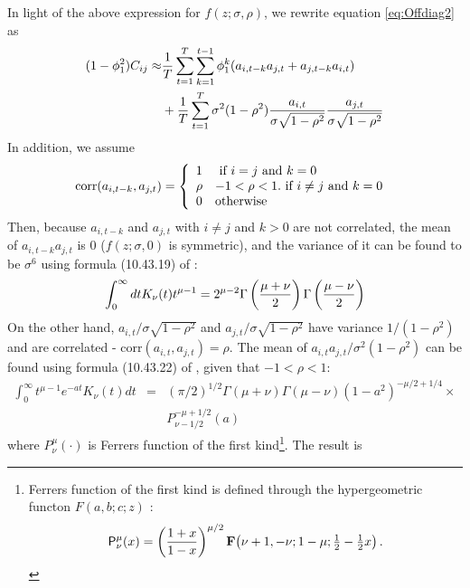 In light of the above expression for $f(z; \sigma,
\rho)$, we rewrite equation \ref{eq:Offdiag2} as
\begin{equation}\label{eq:Cij_dist}
  \begin{aligned}
    (1 - \phi_1^2)C_{ij} \approx &
    {1 \over T}
    \sum_{t=1}^{T} \sum_{k=1}^{t-1}\phi_1^k (a_{i, t-k} a_{j, t} + a_{j,
      t-k} a_{i, t}) \\
    & + {1 \over T} \sum_{t=1}^{T} \sigma^2 (1 - \rho^2) {a_{i,t} \over
      \sigma \sqrt{1 - \rho^2}} {a_{j,t} \over \sigma \sqrt{1 - \rho^2}} \\
  \end{aligned}
\end{equation}
In addition, we assume
\begin{equation*}
  \text{corr}(a_{i, t-k}, a_{j, t}) = \left\{
    \begin{array}{l l}
      1 & \text{ if $i=j$ and $k = 0$ }\\
      \rho & -1 < \rho < 1. \text{ if $i \neq j$ and $k = 0$ }\\
      0 & \text{otherwise}
    \end{array}
  \right.
\end{equation*}
Then, because $a_{i, t-k}$ and $ a_{j, t}$ with $i \neq j$ and $k
> 0$ are not correlated, the mean of $a_{i, t-k} a_{j, t}$ is 0
($f(z; \sigma, 0)$ is symmetric), and the variance of it
can be found to be $\sigma^6$ using formula (10.43.19) of \cite{NIST:DLMF}:
\begin{equation*}
  \int_0^\infty dt K_\nu(t) t^{\mu-1} = 2^{\mu-2}
  \Gamma\left(
    {\mu + \nu \over 2}
  \right) \Gamma\left(
    {\mu - \nu \over 2}
  \right)
\end{equation*}
On the other hand, $a_{i,t}/\sigma \sqrt{1 - \rho^2}$ and
$a_{j,t}/\sigma \sqrt{1 - \rho^2}$ have variance $1/(1 - \rho^2)$
and are correlated - $\text{corr}(a_{i,t}, a_{j,t}) = \rho$. The mean
of $a_{i,t}a_{j,t}/\sigma^2 (1 - \rho^2)$ can be found using formula
(10.43.22) of \cite{NIST:DLMF}, given that $-1 < \rho < 1$:
\begin{eqnarray*}
  \int_0^\infty t^{\mu - 1} e^{-at} K_\nu(t) dt &=& (\pi/2)^{1/2}
  \Gamma(\mu + \nu) \Gamma(\mu - \nu)(1 - a^2)^{-\mu/2 + 1/4} \times\\
  && P^{-\mu+1/2}_{\nu-1/2} (a)
\end{eqnarray*}
where $P^\mu_\nu(\cdot)$ is Ferrers function of the first
kind\footnote{ Ferrers function of the first kind is defined through
  the hypergeometric functon $F(a, b; c; z)$ \cite{NIST:DLMF}:
  \begin{equation}
    \label{eq:Ferrers_1st}
    \mathop{\mathsf{P}^{\mu}_{\nu}\/}\nolimits\!\left(x\right)=\left(\frac{1+x}{1-
        x}\right)^{\mu/2}\mathop{\mathbf{F}\/}\nolimits\!\left(\nu+1,-\nu;1-\mu;\tfrac
      {1}{2}-\tfrac{1}{2}x\right).
  \end{equation}
}. The result is
